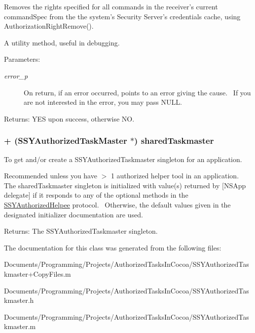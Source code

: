 Removes the rights specified for all commands in the receiver's current commandSpec from the the system's Security Server's credentials cache, using AuthorizationRightRemove(). 

A utility method, useful in debugging.~ \begin{Desc}
\item[Parameters:]
\begin{description}
\item[{\em error\_\-p}]On return, if an error occurred, points to an error giving the cause.~ If you are not interested in the error, you may pass NULL. \end{description}
\end{Desc}
\begin{Desc}
\item[Returns:]YES upon success, otherwise NO. \end{Desc}
\hypertarget{class_s_s_y_authorized_task_master_b9b315e13355015bbf242cf66a433160}{
\subsubsection[{sharedTaskmaster}]{\setlength{\rightskip}{0pt plus 5cm}+ ({\bf SSYAuthorizedTaskMaster} $\ast$) sharedTaskmaster }}
\label{class_s_s_y_authorized_task_master_b9b315e13355015bbf242cf66a433160}


To get and/or create a SSYAuthorizedTaskmaster singleton for an application. 

Recommended unless you have $>$ 1 authorized helper tool in an application.~ The sharedTaskmaster singleton is initialized with value(s) returned by \mbox{[}NSApp delegate\mbox{]} if it responds to any of the optional methods in the \hyperlink{protocol_s_s_y_authorized_helpee-p}{SSYAuthorizedHelpee} protocol.~ Otherwise, the default values given in the designated initializer documentation are used. \begin{Desc}
\item[Returns:]The SSYAuthorizedTaskmaster singleton. \end{Desc}


The documentation for this class was generated from the following files:\begin{CompactItemize}
\item 
Documents/Programming/Projects/AuthorizedTasksInCocoa/SSYAuthorizedTaskmaster+CopyFiles.m\item 
Documents/Programming/Projects/AuthorizedTasksInCocoa/SSYAuthorizedTaskmaster.h\item 
Documents/Programming/Projects/AuthorizedTasksInCocoa/SSYAuthorizedTaskmaster.m\end{CompactItemize}

